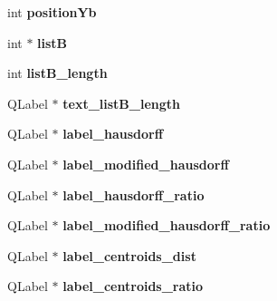 \begin{DoxyCompactItemize}
\item 
\hypertarget{classofeli_1_1_image_viewer_a992a5502d24a5066324360cc5f594570}{int {\bfseries position\-Yb}}\label{classofeli_1_1_image_viewer_a992a5502d24a5066324360cc5f594570}

\item 
\hypertarget{classofeli_1_1_image_viewer_a70c8ca6555963e03f825d282e16e6b48}{int $\ast$ {\bfseries list\-B}}\label{classofeli_1_1_image_viewer_a70c8ca6555963e03f825d282e16e6b48}

\item 
\hypertarget{classofeli_1_1_image_viewer_a7e6fa116decbfd578c8a129ba01fddcf}{int {\bfseries list\-B\-\_\-length}}\label{classofeli_1_1_image_viewer_a7e6fa116decbfd578c8a129ba01fddcf}

\item 
\hypertarget{classofeli_1_1_image_viewer_abd074356c3478e5cf8601ae7bfb11235}{Q\-Label $\ast$ {\bfseries text\-\_\-list\-B\-\_\-length}}\label{classofeli_1_1_image_viewer_abd074356c3478e5cf8601ae7bfb11235}

\item 
\hypertarget{classofeli_1_1_image_viewer_a84d52970c24ed83be25a2ee3699c27ab}{Q\-Label $\ast$ {\bfseries label\-\_\-hausdorff}}\label{classofeli_1_1_image_viewer_a84d52970c24ed83be25a2ee3699c27ab}

\item 
\hypertarget{classofeli_1_1_image_viewer_a003cbe50fc58c4b52747608b0645f997}{Q\-Label $\ast$ {\bfseries label\-\_\-modified\-\_\-hausdorff}}\label{classofeli_1_1_image_viewer_a003cbe50fc58c4b52747608b0645f997}

\item 
\hypertarget{classofeli_1_1_image_viewer_a91e59f307e4f7ec800498c7ab17df47d}{Q\-Label $\ast$ {\bfseries label\-\_\-hausdorff\-\_\-ratio}}\label{classofeli_1_1_image_viewer_a91e59f307e4f7ec800498c7ab17df47d}

\item 
\hypertarget{classofeli_1_1_image_viewer_a3f143ce92f2615d1d396a9c71b06d48d}{Q\-Label $\ast$ {\bfseries label\-\_\-modified\-\_\-hausdorff\-\_\-ratio}}\label{classofeli_1_1_image_viewer_a3f143ce92f2615d1d396a9c71b06d48d}

\item 
\hypertarget{classofeli_1_1_image_viewer_a04e9043aae91eaed0682381971a0f550}{Q\-Label $\ast$ {\bfseries label\-\_\-centroids\-\_\-dist}}\label{classofeli_1_1_image_viewer_a04e9043aae91eaed0682381971a0f550}

\item 
\hypertarget{classofeli_1_1_image_viewer_a52402824aaafa3dfe12b0d3b93b79607}{Q\-Label $\ast$ {\bfseries label\-\_\-centroids\-\_\-ratio}}\label{classofeli_1_1_image_viewer_a52402824aaafa3dfe12b0d3b93b79607}


\end{DoxyCompactItemize}
